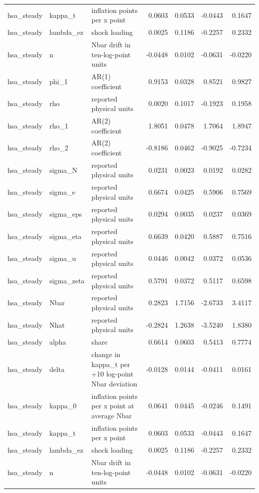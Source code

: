 \begin{tabular}{lllrrrr}
hsa\_steady & kappa\_t & inflation points per x point & 0.0603 & 0.0533 & -0.0443 & 0.1647 \\
hsa\_steady & lambda\_ez & shock loading & 0.0025 & 0.1186 & -0.2257 & 0.2332 \\
hsa\_steady & n & Nbar drift in ten-log-point units & -0.0448 & 0.0102 & -0.0631 & -0.0220 \\
hsa\_steady & phi\_1 & AR(1) coefficient & 0.9153 & 0.0328 & 0.8521 & 0.9827 \\
hsa\_steady & rho & reported physical units & 0.0020 & 0.1017 & -0.1923 & 0.1958 \\
hsa\_steady & rho\_1 & AR(2) coefficient & 1.8051 & 0.0478 & 1.7064 & 1.8947 \\
hsa\_steady & rho\_2 & AR(2) coefficient & -0.8186 & 0.0462 & -0.9025 & -0.7234 \\
hsa\_steady & sigma\_N & reported physical units & 0.0231 & 0.0023 & 0.0192 & 0.0282 \\
hsa\_steady & sigma\_e & reported physical units & 0.6674 & 0.0425 & 0.5906 & 0.7569 \\
hsa\_steady & sigma\_eps & reported physical units & 0.0294 & 0.0035 & 0.0237 & 0.0369 \\
hsa\_steady & sigma\_eta & reported physical units & 0.6639 & 0.0420 & 0.5887 & 0.7516 \\
hsa\_steady & sigma\_u & reported physical units & 0.0446 & 0.0042 & 0.0372 & 0.0536 \\
hsa\_steady & sigma\_zeta & reported physical units & 0.5791 & 0.0372 & 0.5117 & 0.6598 \\
hsa\_steady & Nbar & reported physical units & 0.2823 & 1.7156 & -2.6733 & 3.4117 \\
hsa\_steady & Nhat & reported physical units & -0.2824 & 1.2638 & -3.5240 & 1.8380 \\
hsa\_steady & alpha & share & 0.6614 & 0.0603 & 0.5413 & 0.7774 \\
hsa\_steady & delta & change in kappa\_t per +10 log-point Nbar deviation & -0.0128 & 0.0144 & -0.0411 & 0.0161 \\
hsa\_steady & kappa\_0 & inflation points per x point at average Nbar & 0.0641 & 0.0445 & -0.0246 & 0.1491 \\
hsa\_steady & kappa\_t & inflation points per x point & 0.0603 & 0.0533 & -0.0443 & 0.1647 \\
hsa\_steady & lambda\_ez & shock loading & 0.0025 & 0.1186 & -0.2257 & 0.2332 \\
hsa\_steady & n & Nbar drift in ten-log-point units & -0.0448 & 0.0102 & -0.0631 & -0.0220 \\

\end{tabular}
